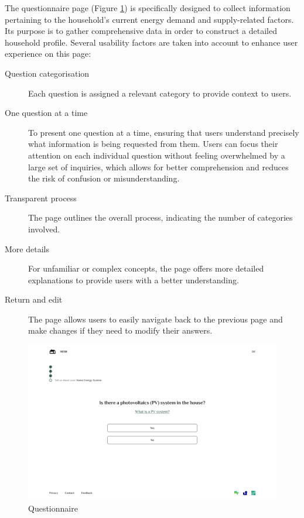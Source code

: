 The questionnaire page (Figure \ref{fig:question}) is specifically designed to collect information pertaining to the household's current energy demand and supply-related factors. 
Its purpose is to gather comprehensive data in order to construct a detailed household profile.
Several usability factors are taken into account to enhance user experience on this page:
\begin{description}
  \item[Question categorisation] Each question is assigned a relevant category to provide context to users.
  \item[One question at a time] To present one question at a time, ensuring that users understand precisely what information is being requested from them. 
    Users can focus their attention on each individual question without feeling overwhelmed by a large set of inquiries, which allows for better comprehension and reduces the risk of confusion or misunderstanding. 
  \item[Transparent process] The page outlines the overall process, indicating the number of categories involved.
  \item[More details] For unfamiliar or complex concepts, the page offers more detailed explanations to provide users with a better understanding.
  \item[Return and edit] The page allows users to easily navigate back to the previous page and make changes if they need to modify their answers. 
\end{description}
\begin{figure}[h!]
  \centering
  \includegraphics[width=\textwidth]{Images/question.png}
  \caption{Questionnaire}
  \label{fig:question}
\end{figure}



